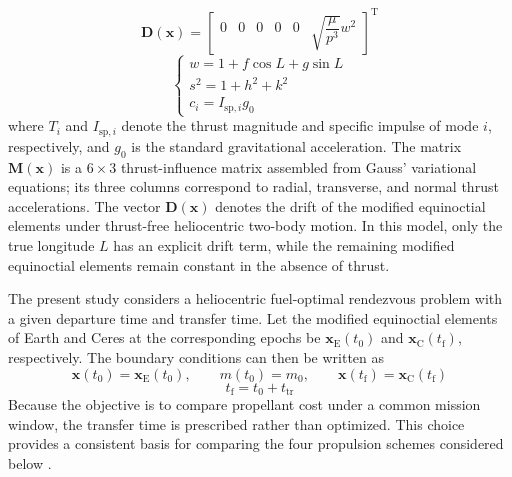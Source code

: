 ﻿\documentclass{IEEEtaes}
\begin{document}
\begin{equation}
\bm{D}(\bm{x})=\begin{bmatrix}0&0&0&0&0&\sqrt{\dfrac{\mu}{p^3}}w^2\end{bmatrix}^{\mathrm{T}}
\end{equation}
\begin{equation}
\begin{cases}
w=1+f\cos L+g\sin L\\
s^2=1+h^2+k^2\\
c_i=I_{\mathrm{sp},i}g_0
\end{cases}
\end{equation}
where $T_i$ and $I_{\mathrm{sp},i}$ denote the thrust magnitude and specific impulse of mode $i$, respectively, and $g_0$ is the standard gravitational acceleration. The matrix $\bm{M}(\bm{x})$ is a $6\times3$ thrust-influence matrix assembled from Gauss' variational equations; its three columns correspond to radial, transverse, and normal thrust accelerations. The vector $\bm{D}(\bm{x})$ denotes the drift of the modified equinoctial elements under thrust-free heliocentric two-body motion. In this model, only the true longitude $L$ has an explicit drift term, while the remaining modified equinoctial elements remain constant in the absence of thrust.

The present study considers a heliocentric fuel-optimal rendezvous problem with a given departure time and transfer time. Let the modified equinoctial elements of Earth and Ceres at the corresponding epochs be $\bm{x}_{\mathrm{E}}(t_0)$ and $\bm{x}_{\mathrm{C}}(t_{\mathrm{f}})$, respectively. The boundary conditions can then be written as
\begin{equation}
\bm{x}(t_0)=\bm{x}_{\mathrm{E}}(t_0),\qquad m(t_0)=m_0,\qquad \bm{x}(t_{\mathrm{f}})=\bm{x}_{\mathrm{C}}(t_{\mathrm{f}})
\end{equation}
\begin{equation}
t_{\mathrm{f}}=t_0+t_{\mathrm{tr}}
\end{equation}
Because the objective is to compare propellant cost under a common mission window, the transfer time is prescribed rather than optimized. This choice provides a consistent basis for comparing the four propulsion schemes considered below \cite{chi2022,cline2024a}.
\end{document}
